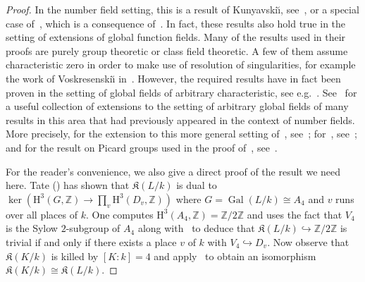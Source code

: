 \documentclass{amsart}
\numberwithin{equation}{section} \numberwithin{figure}{section}
\DeclareMathOperator{\Gal}{Gal} \DeclareMathOperator{\NS}{NS}
\newcommand\ZZ{\mathbb{Z}}
\theoremstyle{one}
\theoremstyle{definition}
\begin{document}
\begin{proof}
In the number field setting, this is a result of Kunyavski\u{\i}, see~\cite{kun:84}, or a special case of~\cite[Proposition~1.8]{mac.new:22}, which is a consequence of~\cite[Theorems~1.1 and 1.3]{mac.new:22}. In fact, these results also hold true in the setting of extensions of global function fields. Many of the results used in their proofs are purely group theoretic or class field theoretic. A few of them assume characteristic zero in order to make use of resolution of singularities, for example the work of Voskresenski\u{\i} in~\cite{vos:70}. However, the required results have in fact been proven in the setting of global fields of arbitrary characteristic, see e.g.~\cite[Corollaire~1]{cths:05}. See~\cite{singh} for a useful collection of extensions to the setting of arbitrary global fields of many results in this area that had previously appeared in the context of number fields.
More precisely, for the extension to this more general setting of~\cite[Theorem~2.1]{mac.new:22}, see~\cite[Section~11.6]{vos:98}; for~\cite[Theorem~2.2]{mac.new:22}, see~\cite[Theorem~5.4]{ct:07}; and for the result on Picard groups used in the proof of~\cite[Theorem~3.3]{mac.new:22}, see~\cite[Proposition~3.1]{ct:07}. 

For the reader's convenience, we also give a direct proof of the result we need here. Tate (\cite[p.\ 198]{cas.fro:67}) has shown that \(\mathfrak{K}(L/k)\) is dual to $\ker(\mathrm{H}^3(G,\ZZ)\to \prod_{v}\mathrm{H}^3(D_v,\ZZ))$
where $G=\Gal(L/k)\cong A_4$ and $v$ runs over all places of $k$. One computes $\mathrm{H}^3(A_4,\ZZ)=\ZZ/2\ZZ$ and uses the fact that $V_4$ is the Sylow $2$-subgroup of $A_4$ along with~\cite[Theorem III.10.3]{bro:82} to deduce that \(\mathfrak{K}(L/k)\hookrightarrow \ZZ/2\ZZ\) is trivial if and only if there exists a place $v$ of $k$ with $V_4\hookrightarrow D_v$. Now observe that $\mathfrak{K}(K/k)$ is killed by $[K:k]=4$ and apply~\cite[Proposition~3.9]{mac.new:22} to obtain an isomorphism $\mathfrak{K}(K/k)\cong\mathfrak{K}(L/k)$.
\end{proof}
\end{document}

